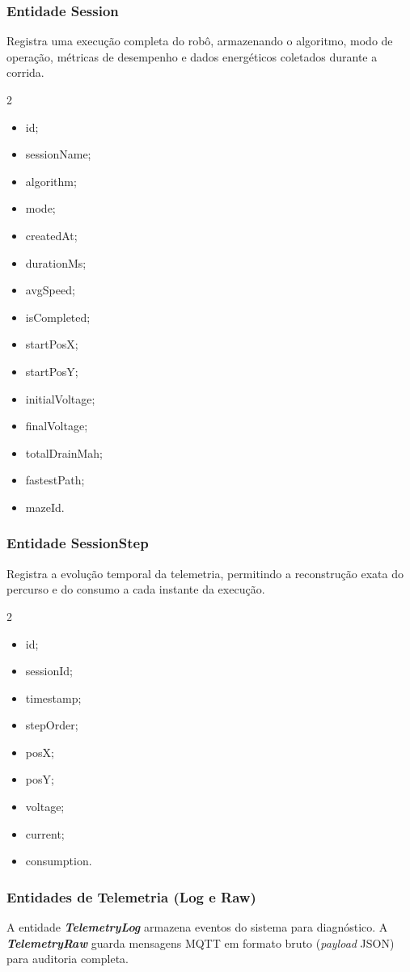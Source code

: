 \begin{itemize}
\begin{itemize}
\subsubsection*{Entidade Session}
Registra uma execução completa do robô, armazenando o algoritmo, modo de operação, métricas de desempenho e dados energéticos coletados durante a corrida.
\begin{multicols}{2}
\begin{itemize}
    \item id; \item sessionName; \item algorithm; \item mode; \item createdAt; \item durationMs; \item avgSpeed; \item isCompleted; \item startPosX; \item startPosY; \item initialVoltage; \item finalVoltage; \item totalDrainMah; \item fastestPath; \item mazeId.
\end{itemize}
\end{multicols}

\subsubsection*{Entidade SessionStep}
Registra a evolução temporal da telemetria, permitindo a reconstrução exata do percurso e do consumo a cada instante da execução.
\begin{multicols}{2}
\begin{itemize}
    \item id; \item sessionId; \item timestamp; \item stepOrder; \item posX; \item posY; \item voltage; \item current; \item consumption.
\end{itemize}
\end{multicols}

\subsubsection*{Entidades de Telemetria (Log e Raw)}
A entidade \textbf{\textit{TelemetryLog}} armazena eventos do sistema para diagnóstico. A \textbf{\textit{TelemetryRaw}} guarda mensagens MQTT em formato bruto (\textit{payload} JSON) para auditoria completa.


\end{itemize}
\end{itemize}
